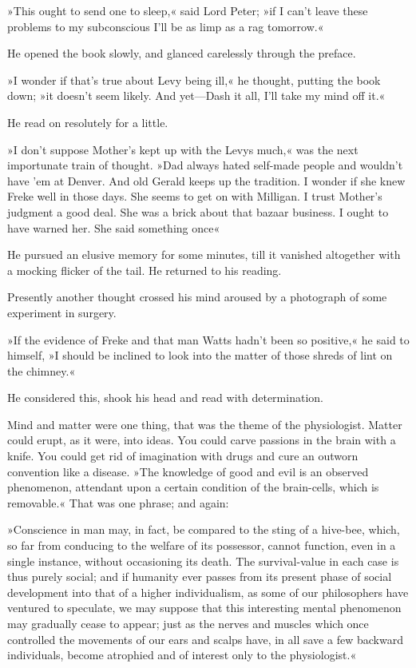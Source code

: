 »This ought to send one to sleep,« said Lord Peter; »if I can't leave these problems to my subconscious I'll be as limp as a rag tomorrow.«

He opened the book slowly, and glanced carelessly through the preface.

»I wonder if that's true about Levy being ill,« he thought, putting the book down; »it doesn't seem likely. And yet\allowbreak---\allowbreak Dash it all, I'll take my mind off it.«

He read on resolutely for a little.

»I don't suppose Mother's kept up with the Levys much,« was the next importunate train of thought. »Dad always hated self-made people and wouldn't have 'em at Denver. And old Gerald keeps up the tradition. I wonder if she knew Freke well in those days. She seems to get on with Milligan. I trust Mother's judgment a good deal. She was a brick about that bazaar business. I ought to have warned her. She said something once\longdash«

He pursued an elusive memory for some minutes, till it vanished altogether with a mocking flicker of the tail. He returned to his reading.

Presently another thought crossed his mind aroused by a photograph of some experiment in surgery.

»If the evidence of Freke and that man Watts hadn't been so positive,« he said to himself, »I should be inclined to look into the matter of those shreds of lint on the chimney.«

He considered this, shook his head and read with determination.

Mind and matter were one thing, that was the theme of the physiologist. Matter could erupt, as it were, into ideas. You could carve passions in the brain with a knife. You could get rid of imagination with drugs and cure an outworn convention like a disease. »The knowledge of good and evil is an observed phenomenon, attendant upon a certain condition of the brain-cells, which is removable.« That was one phrase; and again:

»Conscience in man may, in fact, be compared to the sting of a hive-bee, which, so far from conducing to the welfare of its possessor, cannot function, even in a single instance, without occasioning its death. The survival-value in each case is thus purely social; and if humanity ever passes from its present phase of social development into that of a higher individualism, as some of our philosophers have ventured to speculate, we may suppose that this interesting mental phenomenon may gradually cease to appear; just as the nerves and muscles which once controlled the movements of our ears and scalps have, in all save a few backward individuals, become atrophied and of interest only to the physiologist.«

